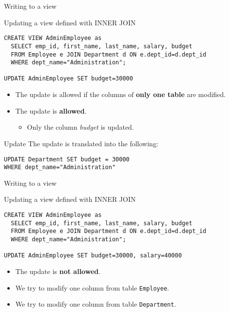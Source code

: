 \documentclass[xcolor=table]{beamer}
\begin{document}
\begin{frame}[fragile]{Writing to a view}
  \begin{block}{Updating a view defined with INNER JOIN}
    \footnotesize
\begin{Verbatim}[commandchars=\\\{\}]
CREATE VIEW AdminEmployee as
  SELECT emp_id, first_name, last_name, salary, budget
  FROM Employee e JOIN Department d ON e.dept_id=d.dept_id
  WHERE dept_name="Administration";

UPDATE AdminEmployee SET budget=30000  
\end{Verbatim}
\end{block}
\vfill
\begin{itemize}
  \item The update is allowed if the columns of {\bf only one table} are modified.
  \item The update is {\bf allowed}.
  \begin{itemize}
    \item Only the column {\em budget} is updated.
  \end{itemize}
\end{itemize}
\vfill
\begin{exampleblock}{Update}
  The update is translated into the following:
  \footnotesize
\begin{verbatim}
UPDATE Department SET budget = 30000
WHERE dept_name="Administration"
\end{verbatim}
\end{exampleblock}
\end{frame}

\begin{frame}[fragile]{Writing to a view}

  \begin{block}{Updating a view defined with INNER JOIN}
    \footnotesize
\begin{Verbatim}[commandchars=\\\{\}]
CREATE VIEW AdminEmployee as
  SELECT emp_id, first_name, last_name, salary, budget
  FROM Employee e JOIN Department d ON e.dept_id=d.dept_id
  WHERE dept_name="Administration";

UPDATE AdminEmployee SET budget=30000, salary=40000  
\end{Verbatim}
\end{block}
\vfill
\begin{itemize}
  \item The update is {\bf not allowed}.
    \item We try to modify one column from table \texttt{Employee}.
    \item We try to modify one column from table \texttt{Department}.
  \end{itemize}

\end{frame}
\end{document}
